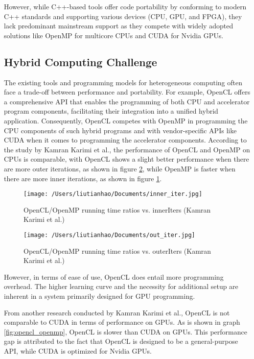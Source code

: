 \documentclass[13pt]{article}
\begin{document}
However, while C++-based tools offer code portability by conforming to modern C++ standards and supporting various devices (CPU, GPU, and FPGA), they lack predominant mainstream support as they compete with widely adopted solutions like OpenMP\cite{openmp} for multicore CPUs and CUDA for Nvidia GPUs.


\subsection{Hybrid Computing Challenge}
The existing tools and programming models for heterogeneous computing often face a trade-off between performance and portability.
For example, OpenCL offers a comprehensive API that enables the programming of both CPU and accelerator program components, facilitating their integration into a unified hybrid application. Consequently, OpenCL competes with OpenMP in programming the CPU components of such hybrid programs and with vendor-specific APIs like CUDA when it comes to programming the accelerator components.
According to the study by Kamran Karimi et al.\cite{opencl_openmp}, the performance of OpenCL and OpenMP on CPUs is comparable, with OpenCL shows a slight better performance when there are more outer iterations, as shown in figure \ref{fig:out_iter}, while OpenMP is faster when there are more inner iterations, as shown in figure \ref{fig:inner_iter}.
\begin{figure}[ht]
    \centering
    \texttt{[image: /Users/liutianhao/Documents/inner\_iter.jpg]}
    \caption{OpenCL/OpenMP running time ratios vs. innerIters (Kamran Karimi et al.\cite{opencl_openmp})}
    \label{fig:inner_iter}
\end{figure}

\begin{figure}[h]
    \centering
    \texttt{[image: /Users/liutianhao/Documents/out\_iter.jpg]}
    \caption{OpenCL/OpenMP running time ratios vs. outerIters (Kamran Karimi et al.\cite{opencl_openmp})}
    \label{fig:out_iter}
\end{figure}

However, in terms of ease of use, OpenCL does entail more programming overhead. The higher learning curve and the necessity for additional setup are inherent in a system primarily designed for GPU programming. 



From another research conducted by Kamran Karimi et al.\cite{cuda_opencl}, OpenCL is not comparable to CUDA in terms of performance on GPUs. As is shown in graph \ref{fig:opencl_openmp}, OpenCL is slower than CUDA on GPUs. 
This performance gap is attributed to the fact that OpenCL is designed to be a general-purpose API, while CUDA is optimized for Nvidia GPUs.
\end{document}
